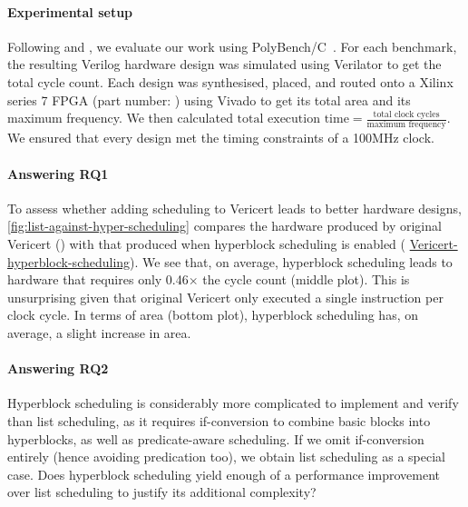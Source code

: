\newcommand\VericertList{%
\setul{-1pt}{3pt}\setulcolor{colorVericertListLIGHT}%
{\ul{\textsf{Vericert-list-scheduling}}}}

\newcommand\VericertHyper{%
\setul{-1pt}{3pt}\setulcolor{colorVericertHyperLIGHT}%
{\ul{\textsf{Vericert-hyperblock-scheduling}}}}

\begin{figure*}
  \centering
  \resizebox{\linewidth}{!}{}
  \caption{Results of simulating and synthesising the PolyBench/C benchmark suite using a range of HLS tools. All figures are relative to \BambuDefault{}.}%
  \label{fig:list-against-hyper-scheduling}
\end{figure*}

\paragraph{Experimental setup}
Following \textcite{herklotz21_formal_verif_high_level_synth} and \textcite{six22_formal_verif_super_sched}, we evaluate our work using PolyBench/C~\cite{pouchet20_polyb_c}. For each benchmark, the resulting Verilog hardware design was simulated using Verilator to get the total cycle count. Each design was synthesised, placed, and routed onto a Xilinx series 7 FPGA (part number: ) using Vivado to get its total area and its maximum frequency.
We then calculated $\text{total execution time} = \frac{\text{total clock cycles}}{\text{maximum frequency}}$.  We ensured that every design met the timing constraints of a 100MHz clock.

\paragraph{Answering RQ1}
To assess whether adding scheduling to Vericert leads to better hardware designs, \cref{fig:list-against-hyper-scheduling} compares the hardware produced by original Vericert (\VericertBase{}) with that produced when hyperblock scheduling is enabled (\VericertHyper{}). We see that, on average, hyperblock scheduling leads to hardware that requires only 0.46$\times$ the cycle count (middle plot). This is unsurprising given that original Vericert only executed a single instruction per clock cycle. In terms of area (bottom plot), hyperblock scheduling has, on average, a slight increase in area.

\paragraph{Answering RQ2}
Hyperblock scheduling is considerably more complicated to implement and verify than list scheduling, as it requires if-conversion to combine basic blocks into hyperblocks, as well as predicate-aware scheduling. If we omit if-conversion entirely (hence avoiding predication too), we obtain list scheduling as a special case. Does hyperblock scheduling yield enough of a performance improvement over list scheduling to justify its additional complexity?

